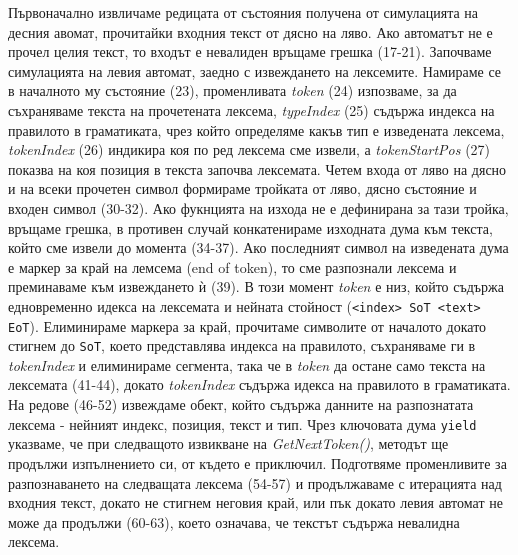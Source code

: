 \documentclass[12pt, oneside]{article}
\theoremstyle{definition}
\begin{document}
Първоначално извличаме редицата от състояния получена от симулацията на десния авомат, прочитайки входния текст от дясно на ляво. Ако автоматът не е прочел целия текст, то входът е невалиден връщаме грешка (17-21). Започваме симулацията на левия автомат, заедно с извеждането на лексемите. Намираме се в началното му състояние (23), променливата \emph{token} (24) изпозваме, за да съхраняваме текста на прочетената лексема, \emph{typeIndex} (25) съдържа индекса на правилото в граматиката, чрез който определяме какъв тип е изведената лексема, \emph{tokenIndex} (26) индикира коя по ред лексема сме извели, а \emph{tokenStartPos} (27) показва на коя позиция в текста започва лексемата. Четем входа от ляво на дясно и на всеки прочетен символ формираме тройката от ляво, дясно състояние и входен символ (30-32). Ако фукнцията на изхода не е дефинирана за тази тройка, връщаме грешка, в противен случай конкатенираме изходната дума към текста, който сме извели до момента (34-37). Ако последният символ на изведената дума е маркер за край на лемсема (end of token), то сме разпознали лексема и преминаваме към извеждането ѝ (39). В този момент \emph{token} е низ, който съдържа едновременно идекса на лексемата и нейната стойност (\verb/<index> SoT <text> EoT/). Елиминираме маркера за край, прочитаме символите от началото докато стигнем до \verb/SoT/, което представлява индекса на правилото, съхраняваме ги в \emph{tokenIndex} и елиминираме сегмента, така че в \emph{token} да остане само текста на лексемата (41-44), докато \emph{tokenIndex} съдържа идекса на правилото в граматиката.  На редове (46-52) извеждаме обект, който съдържа данните на разпознатата лексема - нейният индекс, позиция, текст и тип. Чрез ключовата дума \verb/yield/ указваме, че при следващото извикване на \emph{GetNextToken()}, методът ще продължи изпълнението си, от където е приключил. Подготвяме променливите за разпознаването на следващата лексема (54-57) и продължаваме с итерацията над входния текст, докато не стигнем неговия край, или пък докато левия автомат не може да продължи (60-63), което означава, че текстът съдържа невалидна лексема.
\end{document}

